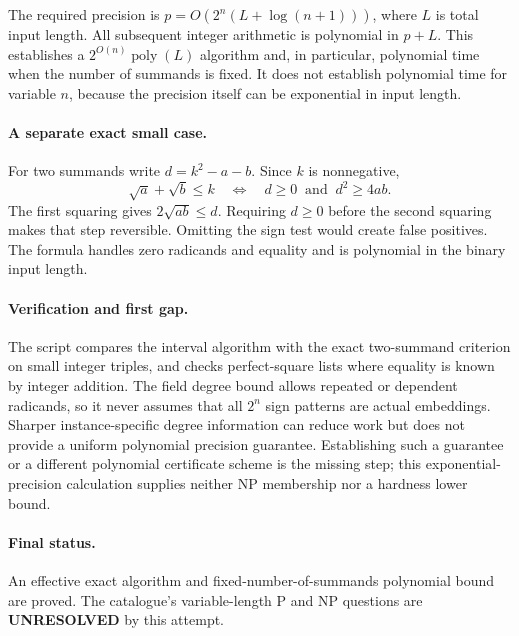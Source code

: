 \documentclass[11pt,a4paper]{article}
\begin{document}
The required precision is $p=O(2^n(L+\log(n+1)))$, where $L$ is total input length. All subsequent integer arithmetic is polynomial in $p+L$. This establishes a $2^{O(n)}\operatorname{poly}(L)$ algorithm and, in particular, polynomial time when the number of summands is fixed. It does not establish polynomial time for variable $n$, because the precision itself can be exponential in input length.

\paragraph{A separate exact small case.}
For two summands write $d=k^2-a-b$. Since $k$ is nonnegative,
\[
 \sqrt a+\sqrt b\le k
 \quad\Longleftrightarrow\quad d\ge0\ \text{ and }\ d^2\ge4ab.
\]
The first squaring gives $2\sqrt{ab}\le d$. Requiring $d\ge0$ before the second squaring makes that step reversible. Omitting the sign test would create false positives. The formula handles zero radicands and equality and is polynomial in the binary input length.

\paragraph{Verification and first gap.}
The script compares the interval algorithm with the exact two-summand criterion on small integer triples, and checks perfect-square lists where equality is known by integer addition. The field degree bound allows repeated or dependent radicands, so it never assumes that all $2^n$ sign patterns are actual embeddings. Sharper instance-specific degree information can reduce work but does not provide a uniform polynomial precision guarantee. Establishing such a guarantee or a different polynomial certificate scheme is the missing step; this exponential-precision calculation supplies neither NP membership nor a hardness lower bound.

\paragraph{Final status.}
An effective exact algorithm and fixed-number-of-summands polynomial bound are proved. The catalogue's variable-length P and NP questions are \textbf{UNRESOLVED} by this attempt.
\end{document}
